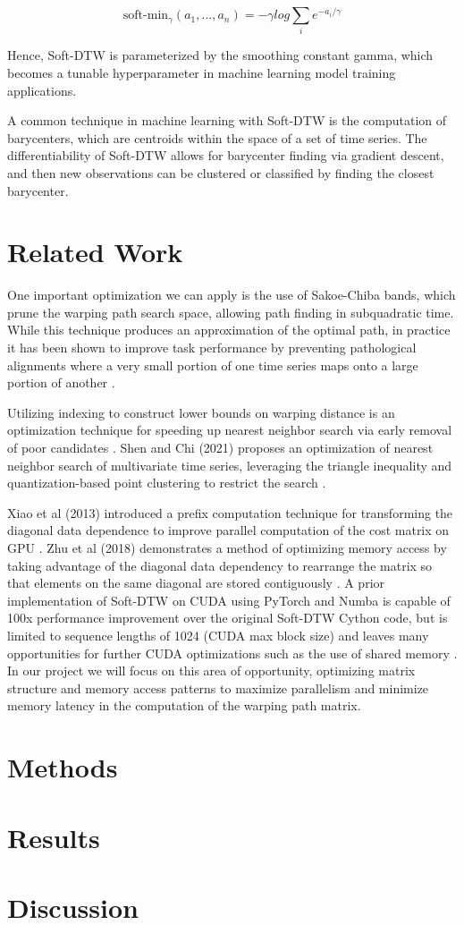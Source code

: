 \documentclass[11pt, letterpaper]{article}
\begin{document}
$$\text{soft-min}_\gamma(a_1,...,a_n) = -\gamma log\sum_{i}e^{-a_i/\gamma}$$

Hence, Soft-DTW is parameterized by the smoothing constant gamma, which becomes
a tunable hyperparameter in machine learning model training applications.

A common technique in machine learning with Soft-DTW is the computation of
barycenters, which are centroids within the space of a set of time series. The
differentiability of Soft-DTW allows for barycenter finding via gradient
descent, and then new observations can be clustered or classified by finding the
closest barycenter.

\section{Related Work}

One important optimization we can apply is the use of Sakoe-Chiba bands, which
prune the warping path search space, allowing path finding in subquadratic time.
While this technique produces an approximation of the optimal path, in practice
it has been shown to improve task performance by preventing pathological
alignments where a very small portion of one time series maps onto a large
portion of another \cite{keogh_exact_2002}.

Utilizing indexing to construct lower bounds on warping distance is an
optimization technique for speeding up nearest neighbor search via early removal
of poor candidates \cite{keogh_exact_2002}. Shen and Chi (2021) proposes an
optimization of nearest neighbor search of multivariate time series, leveraging
the triangle inequality and quantization-based point clustering to restrict the
search \cite{shen_tc-dtw_2021}.

Xiao et al (2013) introduced a prefix computation technique for transforming the
diagonal data dependence to improve parallel computation of the cost matrix on
GPU \cite{xiao_parallelizing_2013}. Zhu et al (2018) demonstrates a method of
optimizing  memory access by taking advantage of the diagonal data dependency to
rearrange the matrix so that elements on the same diagonal are stored
contiguously \cite{zhu_developing_2018}. A prior implementation of Soft-DTW on
CUDA using PyTorch and Numba is capable of 100x performance improvement over the
original Soft-DTW Cython code, but is limited to sequence lengths of 1024 (CUDA
max block size) and leaves many opportunities for further CUDA optimizations
such as the use of shared memory \cite{maghoumi_pytorch-softdtw-cuda_2021}. In
our project we will focus on this area of opportunity, optimizing matrix
structure and memory access patterns to maximize parallelism and minimize memory
latency in the computation of the warping path matrix.

\section{Methods}

\section{Results}

\section{Discussion}

\printbibliography[]
\end{document}
